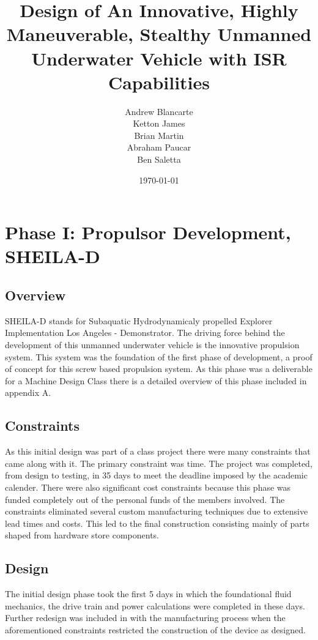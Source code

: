 \documentclass{report}
\title{Design of An Innovative, Highly Maneuverable, Stealthy Unmanned Underwater Vehicle with ISR Capabilities }
\author{Andrew Blancarte\\ Ketton James\\ Brian Martin\\ Abraham Paucar\\ Ben Saletta}
\date{\today}
\begin{document}
\maketitle
\tableofcontents
\listoffigures
\chapter{Phase I: Propulsor Development, SHEILA-D}
\section{Overview}
SHEILA-D stands for Subaquatic Hydrodynamicaly propelled Explorer Implementation Los Angeles - Demonstrator. The driving force behind the development of this unmanned underwater vehicle is the innovative propulsion system. This system was the foundation of the first phase of development, a proof of concept for this screw based propulsion system. As this phase was a deliverable for a Machine Design Class there is a detailed overview of this phase included in appendix A. 
\section{Constraints}
As this initial design was part of a class project there were many constraints that came along with it. The primary constraint was time. The project was completed, from design to testing, in 35 days to meet the deadline imposed by the academic calender. There were also significant cost constraints because this phase was funded completely out of the personal funds of the members involved. The constraints eliminated several custom manufacturing techniques due to extensive lead times and costs. This led to the final construction consisting mainly of parts shaped from hardware store components.
\section{Design}
The initial design phase took the first 5 days in which the foundational fluid mechanics, the drive train and power calculations were completed in these days. Further redesign was included in with the manufacturing process when the aforementioned constraints restricted the construction of the device as designed.
\end{document}
